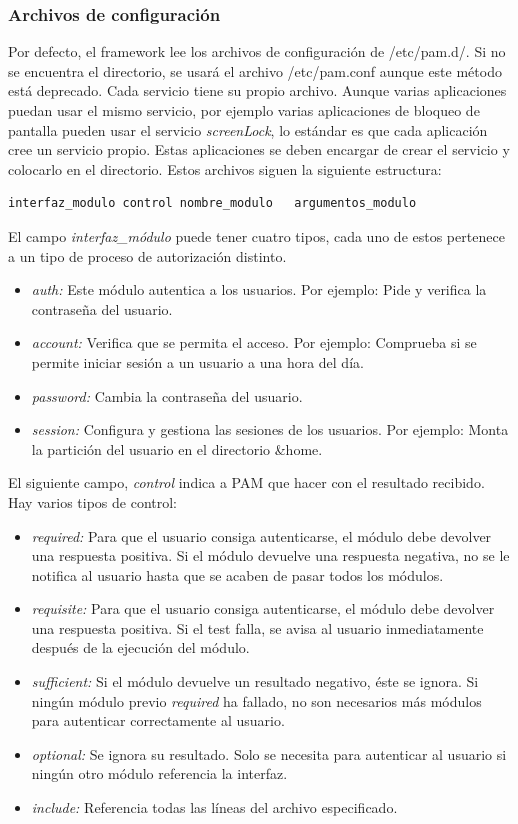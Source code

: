 \documentclass[twoside, titlepage, 12pt, a4paper]{article}
\begin{document}
\subsubsection{Archivos de configuración}
Por defecto, el framework lee los archivos de configuración de /etc/pam.d/. Si no se encuentra el directorio, se usará el archivo /etc/pam.conf aunque este método está deprecado. Cada servicio tiene su propio archivo. Aunque varias aplicaciones puedan usar el mismo servicio, por ejemplo varias aplicaciones de bloqueo de pantalla pueden usar el servicio \textit{screenLock}, lo estándar es que cada aplicación cree un servicio propio. Estas aplicaciones se deben encargar de crear el servicio y colocarlo en el directorio.
Estos archivos siguen la siguiente estructura:
\begin{lstlisting}
interfaz_modulo	control	nombre_modulo	argumentos_modulo
\end{lstlisting} \par
El campo \textit{interfaz\_módulo} puede tener cuatro tipos, cada uno de estos pertenece a un tipo de proceso de autorización distinto.
\begin{itemize}
	\item{\textit{auth: }}Este módulo autentica a los usuarios. Por ejemplo: Pide y verifica la contraseña del usuario.
	\item{\textit{account: }}Verifica que se permita el acceso. Por ejemplo: Comprueba si se permite iniciar sesión a un usuario a una hora del día.
	\item{\textit{password: }}Cambia la contraseña del usuario.
	\item{\textit{session: }}Configura y gestiona las sesiones de los usuarios. Por ejemplo: Monta la partición del usuario en el directorio \&home.
\end{itemize} \par
El siguiente campo, \textit{control} indica a PAM que hacer con el resultado recibido. Hay varios tipos de control:
\begin{itemize}
	\item{\textit{required: }}Para que el usuario consiga autenticarse, el módulo debe devolver una respuesta positiva. Si el módulo devuelve una respuesta negativa, no se le notifica al usuario hasta que se acaben de pasar todos los módulos.
	\item{\textit{requisite: }}Para que el usuario consiga autenticarse, el módulo debe devolver una respuesta positiva. Si el test falla, se avisa al usuario inmediatamente después de la ejecución del módulo.
	\item{\textit{sufficient: }}Si el módulo devuelve un resultado negativo, éste se ignora. Si ningún módulo previo \textit{required} ha fallado, no son necesarios más módulos para autenticar correctamente al usuario.
	\item{\textit{optional: }}Se ignora su resultado. Solo se necesita para autenticar al usuario si ningún otro módulo referencia la interfaz.
	\item{\textit{include: }}Referencia todas las líneas del archivo especificado.
\end{itemize} \par
\end{document}
